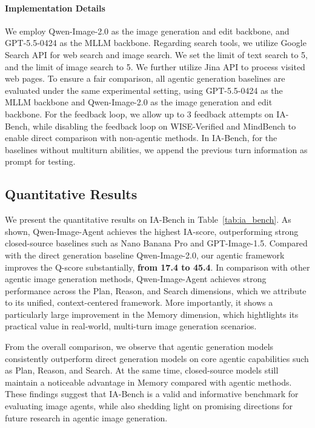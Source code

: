 \paragraph{Implementation Details}
We employ Qwen-Image-2.0 as the image generation and edit backbone, and GPT-5.5-0424 as the MLLM backbone. Regarding search tools, we utilize Google Search API for web search and image search. We set the limit of text search to 5, and the limit of image search to 5. We further utilize Jina API to process visited web pages. To ensure a fair comparison, all agentic generation baselines are evaluated under the same experimental setting, using GPT-5.5-0424 as the MLLM backbone and Qwen-Image-2.0 as the image generation and edit backbone. For the feedback loop, we allow up to 3 feedback attempts on IA-Bench, while disabling the feedback loop on WISE-Verified and MindBench to enable direct comparison with non-agentic methods. In IA-Bench, for the baselines without multiturn abilities, we append the previous turn information as prompt for testing.

\subsection{Quantitative Results}




We present the quantitative results on IA-Bench in Table~\ref{tab:ia_bench}. As shown, Qwen-Image-Agent achieves the highest IA-score, outperforming strong closed-source baselines such as Nano Banana Pro and GPT-Image-1.5. Compared with the direct generation baseline Qwen-Image-2.0, our agentic framework improves the Q-score substantially, \textbf{from 17.4 to 45.4}. In comparison with other agentic image generation methods, Qwen-Image-Agent achieves strong performance across the Plan, Reason, and Search dimensions, which we attribute to its unified, context-centered framework. More importantly, it shows a particularly large improvement in the Memory dimension, which hightlights its practical value in real-world, multi-turn image generation scenarios.

From the overall comparison, we observe that agentic generation models consistently outperform direct generation models on core agentic capabilities such as Plan, Reason, and Search. At the same time, closed-source models still maintain a noticeable advantage in Memory compared with agentic methods. These findings suggest that IA-Bench is a valid and informative benchmark for evaluating image agents, while also shedding light on promising directions for future research in agentic image generation.

